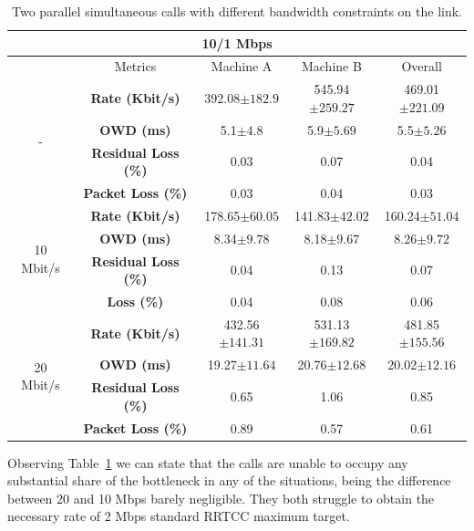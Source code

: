 \begin{table}[h]
\begin{center}
\begin{adjustwidth}{-0.5em}{}
\begin{tabular}{ |c|c|c|c|c| }
\hline
\multicolumn{5}{|c|}{\textbf{10/1 Mbps}} \\ \hline
  & Metrics & Machine A & Machine B & Overall\\ \hline
\multirow{4}{*}{-} & \textbf{Rate (Kbit/s)} & 392.08$\pm182.9$ & 545.94$\pm259.27$ & 469.01$\pm221.09$\\ \cline{2-5}
 & \textbf{OWD (ms)} &  5.1$\pm4.8$ & 5.9$\pm5.69$ & 5.5$\pm5.26$ \\ \cline{2-5}
 & \textbf{Residual Loss (\%)} & 0.03 & 0.07 & 0.04 \\ \cline{2-5}
 & \textbf{Packet Loss (\%)} & 0.03 & 0.04 & 0.03 \\ \hline
\multirow{4}{*}{10 Mbit/s} & \textbf{Rate (Kbit/s)} & 178.65$\pm60.05$ & 141.83$\pm42.02$ & 160.24$\pm51.04$\\ \cline{2-5}
 & \textbf{OWD (ms)} & 8.34$\pm9.78$ & 8.18$\pm9.67$ & 8.26$\pm9.72$ \\ \cline{2-5}
 & \textbf{Residual Loss (\%)} & 0.04 & 0.13 & 0.07 \\ \cline{2-5}
 & \textbf{Loss (\%)} & 0.04 & 0.08 & 0.06 \\ \hline
\multirow{4}{*}{20 Mbit/s} & \textbf{Rate (Kbit/s)} & 432.56$\pm141.31$ & 531.13$\pm169.82$ & 481.85$\pm155.56$\\ \cline{2-5}
 & \textbf{OWD (ms)} & 19.27$\pm11.64$ & 20.76$\pm12.68$ & 20.02$\pm12.16$ \\ \cline{2-5}
 & \textbf{Residual Loss (\%)} & 0.65 & 1.06 & 0.85 \\ \cline{2-5}
 & \textbf{Packet Loss (\%)} & 0.89 & 0.57 & 0.61  \\ \hline
\end{tabular}
\end{adjustwidth}
    \caption[Two parallel simultaneous calls with different bandwidth constraints on the link]{Two parallel simultaneous calls with different bandwidth constraints on the link.}
    \label{fig:two_dummynet}
\end{center}
\end{table}


Observing Table~\ref{fig:two_dummynet} we can state that the calls are unable to occupy any substantial share of the bottleneck in any of the situations, being the difference between 20 and 10 Mbps barely negligible. They both struggle to obtain the necessary rate of 2 Mbps standard RRTCC maximum target.   

